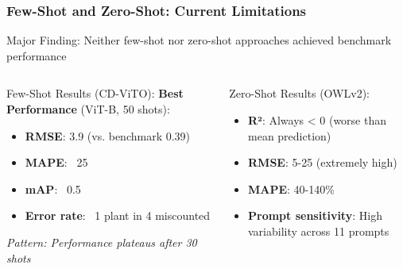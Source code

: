 \documentclass[aspectratio=43]{beamer}
\begin{document}
\begin{frame}
    \frametitle{Few-Shot and Zero-Shot: Current Limitations}
    
    \begin{alertblock}{Major Finding:}
        \large Neither few-shot nor zero-shot approaches achieved benchmark performance
    \end{alertblock}
    
    \begin{columns}
        \begin{column}{0.5\textwidth}
            \begin{block}{Few-Shot Results (CD-ViTO):}
                \small
                \textbf{Best Performance} (ViT-B, 50 shots):
                \begin{itemize}
                    \item \textbf{RMSE}: 3.9 (vs. benchmark 0.39)
                    \item \textbf{MAPE}: ~25%
                    \item \textbf{mAP}: ~0.5
                    \item \textbf{Error rate}: ~1 plant in 4 miscounted
                \end{itemize}
                
                \textit{Pattern: Performance plateaus after 30 shots}
            \end{block}
        \end{column}
        
        \begin{column}{0.5\textwidth}
            \begin{block}{Zero-Shot Results (OWLv2):}
                \small
                \begin{itemize}
                    \item \textbf{R²}: Always < 0 (worse than mean prediction)
                    \item \textbf{RMSE}: 5-25 (extremely high)
                    \item \textbf{MAPE}: 40-140\%
                    \item \textbf{Prompt sensitivity}: High variability across 11 prompts
                \end{itemize}
            \end{block}
        \end{column}
    \end{columns}
    

\end{frame}
\end{document}
